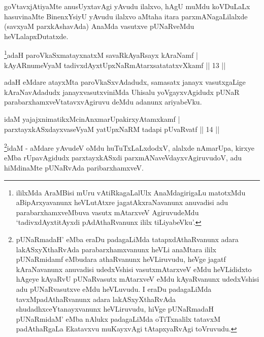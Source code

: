 \begin{artha}
goVtavxjAtiyaMte anusUyxtavAgi yAvudu ilalxvo, hAgU muMdu koVDuLaLx hasuvinaMte BinenxYsiyU yAvudu ilalxvo aMtaha itara parxmANagaLilalxde (savxyaM parxkAshavAda) AnaMda vasutxve pUNaRveMdu heVLalapxDutatxde.
\end{artha}



\begin{shl}
\footnote{ililxMda AraMBisi mUru vAtiRkagaLalUlx AnaMdagirigaLu matotxMdu aBipArxyavanunx heVLutAtxre \mdash  jagatAkxraNavanunx anuvadisi adu parabarxhamxveMbuva vasutx mAtarxveV AgiruvudeMdu `tadivxdAyxtitAyxdi pAdAthaRvanunx ililx tiLiyabeVku'.}adaH paroVkaSxmatayxnatxM savaRkAyaRsayx kAraNamf  | \\
kAyARnumeVyaM tadivxdAyxtUpxNaRmAtarxsatatatxvXkamf \hfill ||  13 ||  
\end{shl}

\begin{artha}
adaH eMdare atayxMta paroVkaSxvAdadudx, samasatx janayx vasutxgaLige kAraNavAdadudx janayxvasutxviniMda Uhisalu yoVgayxvAgidudx pUNaR parabarxhamxveVtatavxvAgiruvu deMdu adanunx ariyabeVku.
\end{artha}


\begin{shl}
idaM yajajxnimatikxMcinAnxmarUpakirxyAtamxkamf  | \\
parxtayxkASxdayxvaseVyaM yatUpxNaRM tadapi pUvaRvatf \hfill||  14 ||  
\end{shl}

\begin{artha}
\footnote{pUNaRmadaH' eMba eraDu padagaLiMda tatapxdAthaRvanunx adara lakASxyXthaRvAda parabarxhamxvanunx heVLi anaMtara ililx pUNaRmidamf eMbudara athaRvanunx heVLiruvudu, heVge jagatf kAraNavanunx anuvadisi udedxVshisi vasutxmAtarxveV eMdu heVLididxto hAgeye kAyaRvU pUNaRvasutx mAtarxveV eMdu kAyaRvanunx udedxVshisi adu pUNaRvasutxve eMdu heVLuvudu. I eraDu padagaLiMda tavxMpadAthaRvanunx adara lakASxyXthaRvAda shudadhxceYtanayxvanunx heVLiruvudu, hiVge pUNaRmadaH pUNaRmidaM' eMba nAlukx padagaLiMda oTiTxnalilx tatavxM padAthaRgaLa Ekatavxvu muKayxvAgi tAtapxyaRvAgi toVruvudu.}idaM - aMdare yAvudeV oMdu huTuTxLaLxdodxV, alalxde nAmarUpa, kirxye eMba rUpavAgidudx parxtayxkASxdi parxmANaveVdayxvAgiruvudoV, adu hiMdinaMte pUNaRvAda paribarxhamxveV. 
\end{artha}

